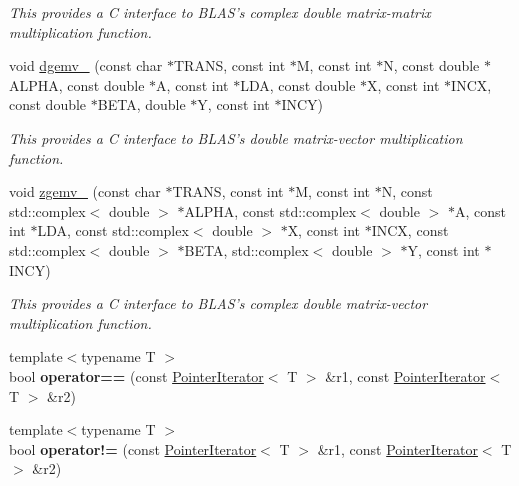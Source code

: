 \begin{DoxyCompactItemize}
\begin{DoxyCompactList}\small\item\em This provides a C interface to B\-L\-A\-S's complex double matrix-\/matrix multiplication function. \end{DoxyCompactList}\item 
\hypertarget{namespacekeycpp_af0676a4a89dbb63f09fc627c05e12699}{void \hyperlink{namespacekeycpp_af0676a4a89dbb63f09fc627c05e12699}{dgemv\-\_\-} (const char $\ast$T\-R\-A\-N\-S, const int $\ast$M, const int $\ast$N, const double $\ast$A\-L\-P\-H\-A, const double $\ast$A, const int $\ast$L\-D\-A, const double $\ast$X, const int $\ast$I\-N\-C\-X, const double $\ast$B\-E\-T\-A, double $\ast$Y, const int $\ast$I\-N\-C\-Y)}\label{namespacekeycpp_af0676a4a89dbb63f09fc627c05e12699}

\begin{DoxyCompactList}\small\item\em This provides a C interface to B\-L\-A\-S's double matrix-\/vector multiplication function. \end{DoxyCompactList}\item 
\hypertarget{namespacekeycpp_aea174778653491b5fd21dd2960c0f7cb}{void \hyperlink{namespacekeycpp_aea174778653491b5fd21dd2960c0f7cb}{zgemv\-\_\-} (const char $\ast$T\-R\-A\-N\-S, const int $\ast$M, const int $\ast$N, const std\-::complex$<$ double $>$ $\ast$A\-L\-P\-H\-A, const std\-::complex$<$ double $>$ $\ast$A, const int $\ast$L\-D\-A, const std\-::complex$<$ double $>$ $\ast$X, const int $\ast$I\-N\-C\-X, const std\-::complex$<$ double $>$ $\ast$B\-E\-T\-A, std\-::complex$<$ double $>$ $\ast$Y, const int $\ast$I\-N\-C\-Y)}\label{namespacekeycpp_aea174778653491b5fd21dd2960c0f7cb}

\begin{DoxyCompactList}\small\item\em This provides a C interface to B\-L\-A\-S's complex double matrix-\/vector multiplication function. \end{DoxyCompactList}\item 
\hypertarget{namespacekeycpp_adfb32fd99bb09455f5a124df4560ab0f}{{\footnotesize template$<$typename T $>$ }\\bool {\bfseries operator==} (const \hyperlink{classkeycpp_1_1_pointer_iterator}{Pointer\-Iterator}$<$ T $>$ \&r1, const \hyperlink{classkeycpp_1_1_pointer_iterator}{Pointer\-Iterator}$<$ T $>$ \&r2)}\label{namespacekeycpp_adfb32fd99bb09455f5a124df4560ab0f}

\item 
\hypertarget{namespacekeycpp_a9358d5f3f08dd8ed262697b7e8b2a4f1}{{\footnotesize template$<$typename T $>$ }\\bool {\bfseries operator!=} (const \hyperlink{classkeycpp_1_1_pointer_iterator}{Pointer\-Iterator}$<$ T $>$ \&r1, const \hyperlink{classkeycpp_1_1_pointer_iterator}{Pointer\-Iterator}$<$ T $>$ \&r2)}\label{namespacekeycpp_a9358d5f3f08dd8ed262697b7e8b2a4f1}


\end{DoxyCompactItemize}
